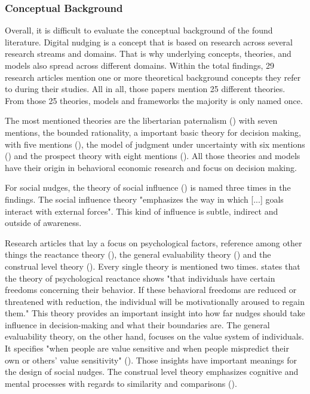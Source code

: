 \subsubsection{Conceptual Background} 
Overall, it is difficult to evaluate the conceptual background of the found literature. Digital nudging is a concept that is based on research across several research streams and domains. That is why underlying concepts, theories, and models also spread across different domains. Within the total findings, 29 research articles mention one or more theoretical background concepts they refer to during their studies. All in all, those papers mention 25 different theories. From those 25 theories, models and frameworks the majority is only named once. 

The most mentioned theories are the libertarian paternalism (\cite{thaler_nudge:_2009}) with seven mentions, the bounded rationality, a important basic theory for decision making, with five mentions (\cite{simon_behavioral_1955}), the model of judgment under uncertainty with six mentions (\cite{tversky_judgment_1974}) and the prospect theory with eight mentions (\cite{kahneman_prospect_1979}). All those theories and models have their origin in behavioral economic research and focus on decision making.

For social nudges, the theory of social influence (\cite{cialdini_social_2004}) is named three times in the findings. The social influence theory "emphasizes the way in which [...] goals interact with external forces". This kind of influence is subtle, indirect and outside of awareness.

Research articles that lay a focus on psychological factors, reference among other things the reactance theory (\cite{brehm_theory_1966}), the general evaluability theory (\cite{hsee_general_2010}) and the construal level theory (\cite{trope_construal-level_2010}). Every single theory is mentioned two times. \cite{brehm_theory_1966} states that the theory of psychological reactance shows "that individuals have certain freedoms concerning their behavior. If these behavioral freedoms are reduced or threatened with reduction, the individual will be motivationally aroused to regain them." This theory provides an important insight into how far nudges should take influence in decision-making and what their boundaries are. The general evaluability theory, on the other hand, focuses on the value system of individuals. It specifies "when people are value sensitive and when people mispredict their own or others' value sensitivity" (\cite{hsee_general_2010}). Those insights have important meanings for the design of social nudges. The construal level theory emphasizes cognitive and mental processes with regards to similarity and comparisons (\cite{trope_construal-level_2010}).

